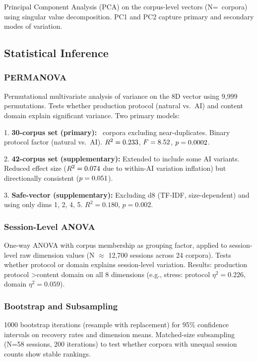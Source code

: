 \documentclass[11pt]{article}
\begin{document}
Principal Component Analysis (PCA) on the corpus-level vectors (N=\nCorpora\ corpora) using singular value decomposition. PC1 and PC2 capture primary and secondary modes of variation.

\subsection{Statistical Inference}

\subsubsection{PERMANOVA}

Permutational multivariate analysis of variance \citep{anderson2001permanova} on the 8D vector using 9,999 permutations. Tests whether production protocol (natural vs.\ AI) and content domain explain significant variance. Two primary models:

1. \textbf{30-corpus set (primary):} \nCorporaPrimary\ corpora excluding near-duplicates. Binary protocol factor (natural vs.\ AI). $R^2 = 0.233$, $F = 8.52$, $p = 0.0002$.

2. \textbf{42-corpus set (supplementary):} Extended to include some AI variants. Reduced effect size ($R^2 = 0.074$ due to within-AI variation inflation) but directionally consistent ($p = 0.051$).

3. \textbf{Safe-vector (supplementary):} Excluding d8 (TF-IDF, size-dependent) and using only dims 1, 2, 4, 5. $R^2 = 0.180$, $p = 0.002$.

\subsubsection{Session-Level ANOVA}

One-way ANOVA with corpus membership as grouping factor, applied to session-level raw dimension values (N $\approx$ 12,700 sessions across 24 corpora). Tests whether protocol or domain explains session-level variation. Results: production protocol \textgreater content domain on all 8 dimensions (e.g., stress: protocol $\eta^2 = 0.226$, domain $\eta^2 = 0.059$).

\subsubsection{Bootstrap and Subsampling}

1000 bootstrap iterations (resample with replacement) for 95\% confidence intervals on recovery rates and dimension means. Matched-size subsampling (N=58 sessions, 200 iterations) to test whether corpora with unequal session counts show stable rankings.
\end{document}
